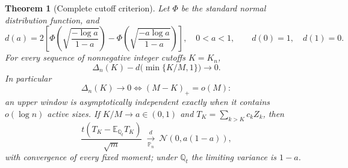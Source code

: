 \documentclass[11pt,a4paper]{article}
\numberwithin{equation}{section}
\newtheorem{theorem}{Theorem}[section]
\theoremstyle{definition}
\theoremstyle{remark}
\newcommand{\PP}{\mathbb P}
\newcommand{\E}{\mathbb E}
\newcommand{\Q}{\mathbb Q}
\newcommand{\Normal}{\mathcal N}
\begin{document}
\begin{theorem}[Complete cutoff criterion]\label{ctp:cl:thm:threshold}
Let $\Phi$ be the standard normal distribution function, and
\begin{equation}\label{ctp:cl:eq:d}
 d(a)=2\left[\Phi\!\left(\sqrt{\frac{-\log a}{1-a}}\right)
 -\Phi\!\left(\sqrt{\frac{-a\log a}{1-a}}\right)\right],\quad0<a<1,
 \qquad d(0)=1,\quad d(1)=0.
\end{equation}
For every sequence of nonnegative integer cutoffs $K=K_n$,
\begin{equation}\label{ctp:cl:eq:tvlimit}
 \Delta_n(K)-d\bigl(\min\{K/M,1\}\bigr)\longrightarrow0.
\end{equation}
In particular
\begin{equation}\label{ctp:cl:eq:iff}
 \Delta_n(K)\to0\iff(M-K)_+=o(M):
\end{equation}
an upper window is asymptotically independent exactly when it contains
$o(\log n)$ active sizes. If $K/M\to a\in(0,1)$ and
$T_K=\sum_{k>K}c_kZ_k$, then
\begin{equation}\label{ctp:cl:eq:criticalenergy}
 \frac{t(T_K-\E_{\Q_t}T_K)}{\sqrt m}\ \xrightarrow[\PP_n]{\ d\ }\ \Normal(0,a(1-a)),
\end{equation}
with convergence of every fixed moment; under $\Q_t$ the limiting variance
is $1-a$.
\end{theorem}
\end{document}
